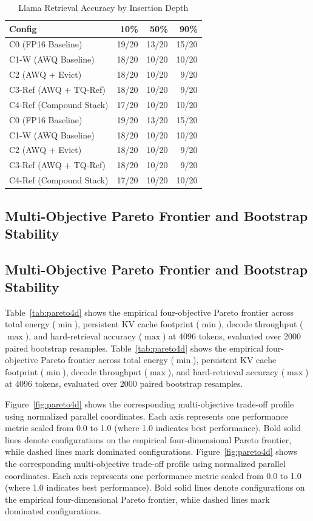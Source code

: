 \documentclass[sigconf,nonacm]{acmart}
\begin{document}
\begin{table}[htbp]
\caption{Llama Retrieval Accuracy by Insertion Depth}
\label{tab:depth}
\centering\small
\begin{tabular}{lrrr}
\toprule
\textbf{Config} & \textbf{10\%} & \textbf{50\%} & \textbf{90\%} \\
\midrule
C0 (FP16 Baseline)      & 19/20 & 13/20 & 15/20 \\
C1-W (AWQ Baseline)     & 18/20 & 10/20 & 10/20 \\
C2 (AWQ + Evict)        & 18/20 & 10/20 &  9/20 \\
C3-Ref (AWQ + TQ-Ref)   & 18/20 & 10/20 &  9/20 \\
C4-Ref (Compound Stack) & 17/20 & 10/20 & 10/20 \\
C0 (FP16 Baseline)      & 19/20 & 13/20 & 15/20 \\
C1-W (AWQ Baseline)     & 18/20 & 10/20 & 10/20 \\
C2 (AWQ + Evict)        & 18/20 & 10/20 &  9/20 \\
C3-Ref (AWQ + TQ-Ref)   & 18/20 & 10/20 &  9/20 \\
C4-Ref (Compound Stack) & 17/20 & 10/20 & 10/20 \\
\bottomrule
\end{tabular}
\end{table}

\subsection{Multi-Objective Pareto Frontier and Bootstrap Stability}
\subsection{Multi-Objective Pareto Frontier and Bootstrap Stability}

Table~\ref{tab:pareto4d} shows the empirical four-objective Pareto frontier across total energy ($\min$), persistent KV cache footprint ($\min$), decode throughput ($\max$), and hard-retrieval accuracy ($\max$) at 4096 tokens, evaluated over 2000 paired bootstrap resamples.
Table~\ref{tab:pareto4d} shows the empirical four-objective Pareto frontier across total energy ($\min$), persistent KV cache footprint ($\min$), decode throughput ($\max$), and hard-retrieval accuracy ($\max$) at 4096 tokens, evaluated over 2000 paired bootstrap resamples.

Figure~\ref{fig:pareto4d} shows the corresponding multi-objective trade-off profile using normalized parallel coordinates. Each axis represents one performance metric scaled from 0.0 to 1.0 (where 1.0 indicates best performance). Bold solid lines denote configurations on the empirical four-dimensional Pareto frontier, while dashed lines mark dominated configurations.
Figure~\ref{fig:pareto4d} shows the corresponding multi-objective trade-off profile using normalized parallel coordinates. Each axis represents one performance metric scaled from 0.0 to 1.0 (where 1.0 indicates best performance). Bold solid lines denote configurations on the empirical four-dimensional Pareto frontier, while dashed lines mark dominated configurations.
\end{document}
